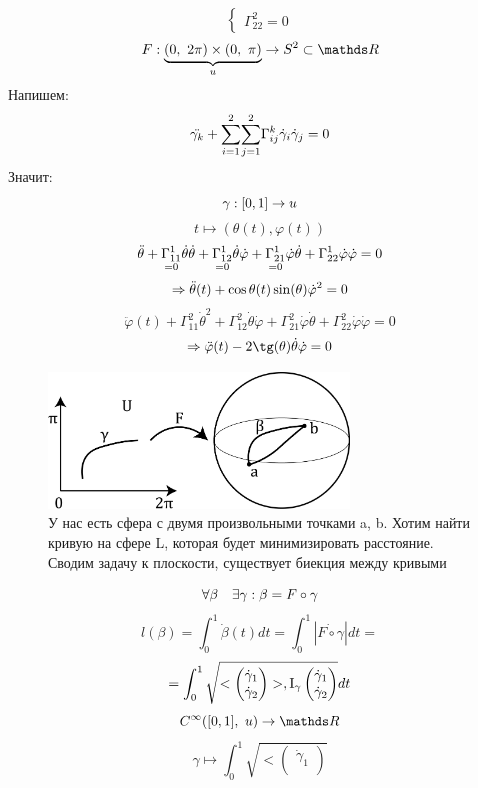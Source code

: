 \documentclass[main]{subfiles}
\begin{document}
\begin{sol}
\[\begin{cases}
            \Gamma_{22}^2 = 0
        \end{cases}\]
        \[F: \ub{u}{(0,\ 2\pi) \times (0,\ \pi)} \ra S^2 \subset \R\]
        Напишем:
        \[\ddot{\gamma_k} + \underset{i=1}{\overset{2}{\sum}} \underset{j=1}{\overset{2}{\sum}} \Gamma_{ij}^k \dot{\gamma}_i \dot{\gamma}_j = 0\]
        Значит:
        \[\gamma: [0,1] \rightarrow u\]
        \[t \mapsto (\theta(t), \varphi(t))\]
        \[\ddot{\theta} + \underset{=0}{\Gamma_{11}^1} \dot{\theta} \dot{\theta} + \underset{=0}{\Gamma_{12}^1} \dot{\theta} \dot{\varphi} + \underset{=0}{\Gamma_{21}^1} \dot{\varphi} \dot{\theta} + \Gamma_{22}^1 \dot{\varphi} \dot{\varphi} = 0\]
        \[\Rightarrow \ddot{\theta}(t) + \cos \theta(t) \sin (\theta) \dot{\varphi}^2 = 0\]
        \[\ddot{\varphi}(t) + \Gamma_{11}^2 \dot{\theta}^2 + \Gamma_{12}^2 \dot{\theta} \dot{\varphi} + \Gamma_{21}^2 \dot{\varphi} \dot{\theta} + \Gamma_{22}^2 \dot{\varphi} \dot{\varphi} = 0\]
        \[\Ra \ddot{\varphi}(t) - 2\tg(\theta) \dot{\theta} \dot{\varphi} = 0\]
        \begin{figure}[H]
            \centering
            \includegraphics[width=8cm]{pics/14_2}
            \caption{У нас есть сфера с двумя произвольными точками a, b. Хотим найти кривую на сфере L, которая будет минимизировать расстояние. Сводим задачу к плоскости, существует биекция между кривыми}
        \end{figure}
        \[\forall \beta \quad \exists \gamma: \beta = F \circ \gamma\]
        \[l(\beta) = \int_0^1 \dot{\beta}(t) dt = \int_0^1 |\dot{F \circ \gamma}| dt =\]
        \[= \int_0^1 \sqrt{<\begin{pmatrix}
            \dot{\gamma}_1\\
            \dot{\gamma}_2
        \end{pmatrix}>, \RNumb{1}_{\gamma} \begin{pmatrix}
            \dot{\gamma}_1\\
            \dot{\gamma}_2
        \end{pmatrix}} dt\]
        \[C^{\infty}([0,1],\ u) \ra \R\]
        \[\gamma \mapsto \int_0^1 \sqrt{<\begin{pmatrix}
            \dot{\gamma}_1\\

\end{pmatrix}}\]
\end{sol}
\end{document}
